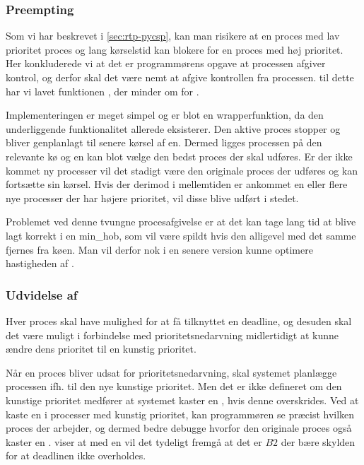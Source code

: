 \subsubsection{Preempting}

Som vi har beskrevet i \cref{sec:rtp-pycsp}, kan  man risikere at en proces med lav prioritet proces og lang kørselstid kan blokere for en proces med høj prioritet. 
Her konkluderede vi at det er programmørens opgave at processen afgiver kontrol, og derfor skal det være nemt at afgive kontrollen fra processen. til dette har vi lavet funktionen , der minder om  for .

Implementeringen er meget simpel og er blot en wrapperfunktion, da den underliggende funktionalitet allerede eksisterer. Den aktive proces stopper og bliver genplanlagt til senere kørsel af \sched en. Dermed ligges processen på den relevante kø og  \sched en  kan blot vælge  den bedst proces der skal udføres. Er  der ikke kommet ny processer vil det stadigt være den originale proces der udføres og kan fortsætte sin kørsel. Hvis der derimod i mellemtiden er ankommet en eller flere nye processer der har højere prioritet, vil disse blive udført i stedet.

Problemet ved denne tvungne procesafgivelse er at det kan tage lang tid at blive lagt korrekt i en min\_hob, som vil være spildt hvis den alligevel med det samme fjernes fra køen. Man vil derfor nok i en senere version kunne optimere hastigheden af .


\subsubsection{Udvidelse af }

Hver proces skal have mulighed for at få tilknyttet en deadline, og desuden skal det være muligt i forbindelse med prioritetsnedarvning midlertidigt at kunne ændre dens prioritet til en kunstig prioritet.

Når en proces bliver udsat for prioritetsnedarvning, skal systemet planlægge processen ifh. til den nye kunstige prioritet. Men det er ikke defineret om den kunstige prioritet medfører at systemet kaster en  ,  hvis  denne overskrides. Ved at kaste en  i processer med kunstig prioritet, kan programmøren se præcist hvilken proces der arbejder, og dermed bedre debugge hvorfor den originale proces også kaster en .  viser at med en  vil det tydeligt fremgå at det er $B2$ der bære skylden for at deadlinen ikke overholdes.

